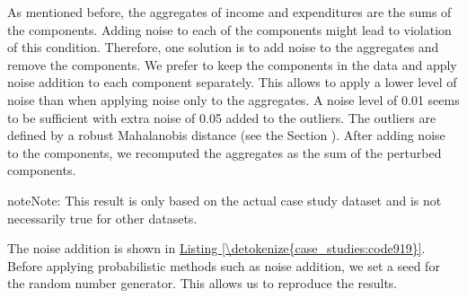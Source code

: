 \documentclass[letterpaper,10pt,english]{sphinxmanual}
\begin{document}
As mentioned before, the aggregates of income and expenditures are the
sums of the components. Adding noise to each of the components might
lead to violation of this condition. Therefore, one solution is to add
noise to the aggregates and remove the components. We prefer to keep the
components in the data and apply noise addition to each component
separately. This allows to apply a lower level of noise than when
applying noise only to the aggregates. A noise level of 0.01 seems to be
sufficient with extra noise of 0.05 added to the outliers. The outliers
are defined by a robust Mahalanobis distance
(see the Section ). After
adding noise to the components, we recomputed the aggregates as the sum
of the perturbed components.

\begin{sphinxadmonition}{note}{Note:}
This result is only based on the actual case study dataset and is not necessarily true for other datasets.
\end{sphinxadmonition}

The noise addition is shown in \hyperref[\detokenize{case_studies:code919}]{Listing \ref{\detokenize{case_studies:code919}}}. Before applying
probabilistic methods such as noise addition, we set a seed for the
random number generator. This allows us to reproduce the results.
\end{document}
